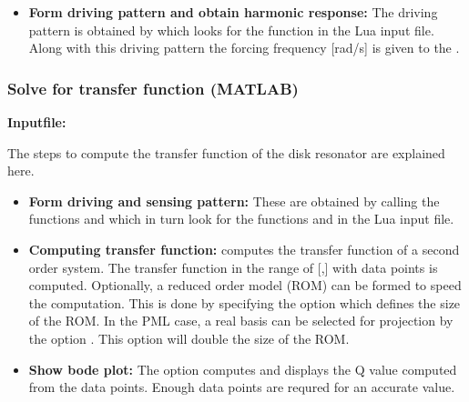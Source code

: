 \begin{itemize}

  \item{\textbf{Form driving pattern and obtain harmonic response:}}
  The driving pattern is obtained by 
  which looks for the function  in 
  the Lua input file. Along with this driving pattern the 
  forcing frequency [rad/s] is given to the 
  .

\end{itemize}

\clearpage
\subsubsection*{Solve for transfer function (MATLAB)}
\begin{flushleft}
  \textbf{Inputfile:}
  \\
\end{flushleft}
\hspace{1in}
{\footnotesize
{}
}

\clearpage
The steps to compute the transfer function of the disk 
resonator are explained here. 

\begin{itemize}

  \item{\textbf{Form driving and sensing pattern:}}
  These are obtained by calling the functions 
   and 
  which in turn look for the functions 
   and 
  in the Lua input file.

  \item{\textbf{Computing transfer function:}}
   computes the transfer function
  of a second order system. The transfer function in the
  range of [,] with 
  data points is computed. Optionally, a reduced order model (ROM) 
  can be formed to speed the computation. This is done by 
  specifying the  option which defines the size
  of the ROM. In the PML case, a real basis
  can be selected for projection by the option .
  This option will double the size of the ROM.
 
  \item{\textbf{Show bode plot:}}
  The option  computes and displays the Q value 
  computed from the data points. Enough data points are requred
  for an accurate value.  

\end{itemize}

